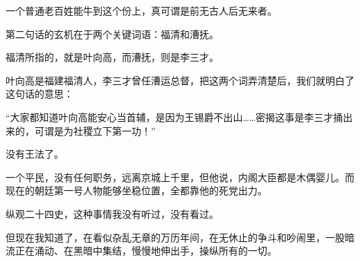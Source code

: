 \begin{multicols}{\theparacolNo}
一个普通老百姓能牛到这个份上，真可谓是前无古人后无来者。

第二句话的玄机在于两个关键词语：福清和漕抚。

福清所指的，就是叶向高，而漕抚，则是李三才。

叶向高是福建福清人，李三才曾任漕运总督，把这两个词弄清楚后，我们就明白了这句话的意思：

“大家都知道叶向高能安心当首辅，是因为王锡爵不出山……密揭这事是李三才捅出来的，可谓是为社稷立下第一功！”

没有王法了。

一个平民，没有任何职务，远离京城上千里，但他说，内阁大臣都是木偶婴儿。而现在的朝廷第一号人物能够坐稳位置，全都靠他的死党出力。

纵观二十四史，这种事情我没有听过，没有看过。

但现在我知道了，在看似杂乱无章的万历年间，在无休止的争斗和吵闹里，一股暗流正在涌动、在黑暗中集结，慢慢地伸出手，操纵所有的一切。
\ifnum{}
	\end{multicols}
\fi
\newpage
